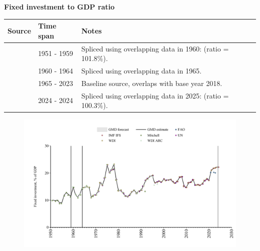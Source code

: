 \documentclass[12pt,a4paper,landscape]{article}
\begin{document}
\begin{adjustbox}{max totalsize={\paperwidth}{\paperheight},center}
\begin{minipage}[t][\textheight][t]{\textwidth}
\vspace*{0.5cm}
{}
\begin{center}
{\Large\bfseries Fixed investment to GDP ratio}
\end{center}
\vspace{0.5cm}
\begin{table}[H]
\centering
\small
\begin{tabular}{|l|l|l|}
\hline
\textbf{Source} & \textbf{Time span} & \textbf{Notes} \\
\hline
\rowcolor{white}\cite{Mitchell}& 1951 - 1959 &Spliced using overlapping data in 1960: (ratio = 101.8\%). \\
\rowcolor{lightgray}\cite{WDI_ARC}& 1960 - 1964 &Spliced using overlapping data in 1965. \\
\rowcolor{white}\cite{WDI}& 1965 - 2023 &Baseline source, overlaps with base year 2018. \\
\rowcolor{lightgray}\cite{IMF_IFS}& 2024 - 2024 &Spliced using overlapping data in 2025: (ratio = 100.3\%). \\
\hline
\end{tabular}
\end{table}
\begin{figure}[H]
\centering
\includegraphics[width=\textwidth,height=0.6\textheight,keepaspectratio]{graphs/SLV_finv_GDP.pdf}
\end{figure}
\end{minipage}
\end{adjustbox}
\end{document}
